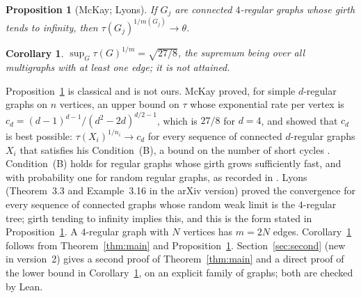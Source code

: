 \documentclass[11pt]{amsart}
\theoremstyle{plain}
\newtheorem{proposition}[theorem]{Proposition}
\newtheorem{corollary}[theorem]{Corollary}
\theoremstyle{remark}
\newcommand{\tht}{\theta}
\begin{document}
\begin{proposition}[McKay; Lyons]\label{prop:sharp}
If $G_j$ are connected $4$-regular graphs whose girth tends to infinity, then $\tau(G_j)^{1/m(G_j)}\to\tht$.
\end{proposition}

\begin{corollary}\label{cor:sup}
$\sup_G\tau(G)^{1/m}=\sqrt{27/8}$, the supremum being over all multigraphs with at least one edge; it is not attained.
\end{corollary}

Proposition~\ref{prop:sharp} is classical and is not ours. McKay \cite{McKay} proved, for simple $d$-regular
graphs on $n$ vertices, an upper bound on $\tau$ whose exponential rate per vertex is
$c_d=(d-1)^{d-1}/(d^2-2d)^{d/2-1}$, which is $27/8$ for $d=4$, and showed that $c_d$ is best possible:
$\tau(X_i)^{1/n_i}\to c_d$ for every sequence of connected $d$-regular graphs $X_i$ that satisfies his
Condition~(B), a bound on the number of short cycles \cite[Theorem~4.3]{McKay}. Condition~(B) holds for regular
graphs whose girth grows sufficiently fast, and with probability one for random regular graphs, as recorded in
\cite[Section~4 and Theorem~4.1]{McKay}. Lyons \cite{Lyons} (Theorem~3.3 and Example~3.16 in the arXiv version)
proved the convergence for every sequence of connected graphs whose random weak limit is the $4$-regular tree;
girth tending to infinity implies this, and this is the form stated in Proposition~\ref{prop:sharp}. A
$4$-regular graph with $N$ vertices has $m=2N$ edges. Corollary~\ref{cor:sup} follows from Theorem~\ref{thm:main} and Proposition~\ref{prop:sharp}.
Section~\ref{sec:second} (new in version~2) gives a second proof of Theorem~\ref{thm:main} and a direct proof of the
lower bound in Corollary~\ref{cor:sup}, on an explicit family of graphs; both are checked by Lean.
\end{document}
